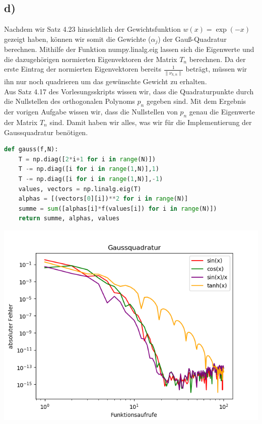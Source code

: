 \subsection*{d)}
Nachdem wir Satz 4.23 hinsichtlich der Gewichtsfunktion $w(x)=\exp(-x)$ gezeigt haben, können wir somit die Gewichte ($\alpha_{j}$) der Gauß-Quadratur berechnen.
Mithilfe der Funktion numpy.linalg.eig lassen sich die Eigenwerte und die dazugehörigen normierten Eigenvektoren der Matrix $T_{n}$ berechnen. Da der erste Eintrag der normierten Eigenvektoren bereits $\frac{1}{\lVert\nu_{k,n}\rVert}$ beträgt, müssen wir ihn nur noch quadrieren um das gewünschte Gewicht zu erhalten.\\
Aus Satz 4.17 des Vorlesungsskripts wissen wir, dass die Quadraturpunkte durch die Nullstellen des orthogonalen Polynoms $p_n$ gegeben sind. Mit dem Ergebnis der vorigen Aufgabe wissen wir, dass die Nullstellen von $p_n$ genau die Eigenwerte der Matrix $T_n$ sind. Damit haben wir alles, was wir für die Implementierung der Gaussquadratur benötigen.\\
\begin{lstlisting}[language=Python]
def gauss(f,N):
    T = np.diag([2*i+1 for i in range(N)])
    T -= np.diag([i for i in range(1,N)],1)
    T -= np.diag([i for i in range(1,N)],-1)
    values, vectors = np.linalg.eig(T)
    alphas = [(vectors[0][i])**2 for i in range(N)]
    summe = sum([alphas[i]*f(values[i]) for i in range(N)])
    return summe, alphas, values
\end{lstlisting}
\includegraphics[width=1.2\linewidth]{gauss.png}
